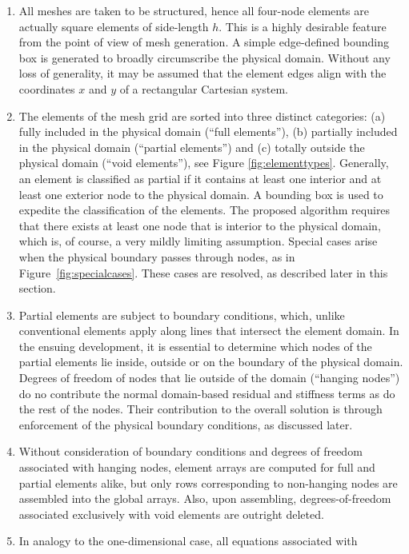 \documentclass[12pt,twoside]{article}
\begin{document}
\begin{enumerate}
%
\item All meshes are taken to be structured, hence all four-node elements are
actually square elements of side-length $h$. This is a highly desirable 
feature from the
point of view of mesh generation. A simple edge-defined bounding box
is generated to broadly circumscribe the physical domain. Without any
loss of generality, it may be assumed that the element edges align
with the coordinates $x$ and $y$ of a rectangular Cartesian system. 
%
\item The elements of the mesh grid are sorted into three distinct categories: 
(a) fully included in the physical domain (``full elements''), (b) partially 
included in the physical domain (``partial elements'') and (c) totally outside 
the physical domain (``void elements''), see Figure \ref{fig:elementtypes}.
Generally, an element is classified as partial if it contains at least one
interior and at least one exterior node to the physical domain. 
A bounding box is used to expedite the classification of the elements. 
The proposed algorithm requires that there exists at least one node
that is interior to the physical domain, which is, of course, a very
mildly limiting assumption. Special cases arise
when the physical boundary passes through nodes, as in 
Figure~\ref{fig:specialcases}. These cases are resolved, as described
later in this section. 
%
\item Partial elements are subject to boundary conditions, which,
unlike conventional elements apply along lines that intersect the
element domain. In the ensuing development, it is essential to determine 
which nodes of the partial elements lie inside, outside or on the
boundary of the physical domain. Degrees of freedom of nodes that lie outside 
of the domain (``hanging nodes'') do no contribute the normal
domain-based residual and stiffness terms as do the rest of the nodes.
Their contribution to the overall solution is through enforcement of
the physical boundary conditions, as discussed later.
%
\item Without consideration of boundary conditions and degrees of
freedom associated with hanging nodes, element arrays are computed 
for full and partial elements alike, but only rows corresponding to
non-hanging nodes are assembled into the global arrays. Also, upon assembling,
degrees-of-freedom associated exclusively with void elements are outright 
deleted. 
%
\item In analogy to the one-dimensional case, all equations associated with 

\end{enumerate}
\end{document}

